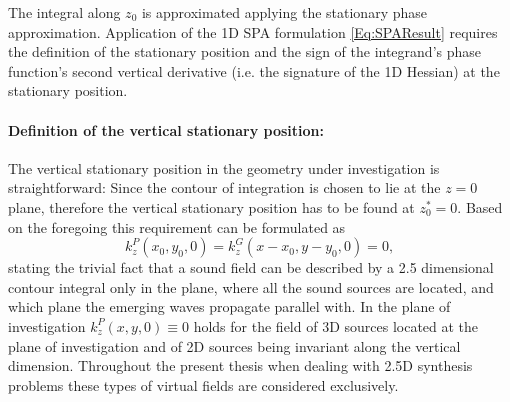 The integral along $z_0$ is approximated applying the stationary phase approximation.
Application of the 1D SPA formulation \eqref{Eq:SPAResult} requires the definition of the stationary position and the sign of the integrand's phase function's second vertical derivative (i.e. the signature of the 1D Hessian) at the stationary position.

\paragraph{Definition of the vertical stationary position:}
The vertical stationary position in the geometry under investigation is straightforward:
Since the contour of integration is chosen to lie at the $z=0$ plane, therefore the vertical stationary position has to be found at $z_0^* = 0$.
Based on the foregoing this requirement can be formulated as
\begin{equation}
k_z^P(x_0,y_0,0) = k_z^G(x-x_0,y-y_0,0) = 0,
\end{equation}
stating the trivial fact that a sound field can be described by a 2.5 dimensional contour integral only in the plane, where all the sound sources are located, and which plane the emerging waves propagate parallel with.
In the plane of investigation $k_z^P(x,y,0) \equiv 0$ holds for the field of 3D sources located at the plane of investigation and of 2D sources being invariant along the vertical dimension.
Throughout the present thesis when dealing with 2.5D synthesis problems these types of virtual fields are considered exclusively.

